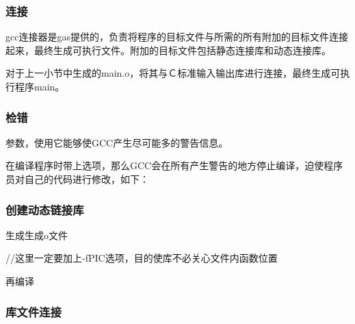 \documentclass[letterpaper,12pt,english]{sphinxmanual}
\begin{document}
\subsubsection*{连接}

\begin{DUlineblock}{0em}
\item[] gcc连接器是gas提供的，负责将程序的目标文件与所需的所有附加的目标文件连接起来，最终生成可执行文件。附加的目标文件包括静态连接库和动态连接库。
\item[] 对于上一小节中生成的main.o，将其与Ｃ标准输入输出库进行连接，最终生成可执行程序main。
\end{DUlineblock}
\subsubsection*{检错}

\begin{DUlineblock}{0em}
\item[] 参数，使用它能够使GCC产生尽可能多的警告信息。
\item[] 
\item[] 在编译程序时带上选项，那么GCC会在所有产生警告的地方停止编译，迫使程序员对自己的代码进行修改，如下：
\item[] 
\end{DUlineblock}
\subsubsection*{创建动态链接库}

\begin{DUlineblock}{0em}
\item[] 生成生成o文件
\item[] 
//这里一定要加上-fPIC选项，目的使库不必关心文件内函数位置
\item[] 再编译
\item[] 
\end{DUlineblock}
\subsubsection*{库文件连接}
\end{document}
